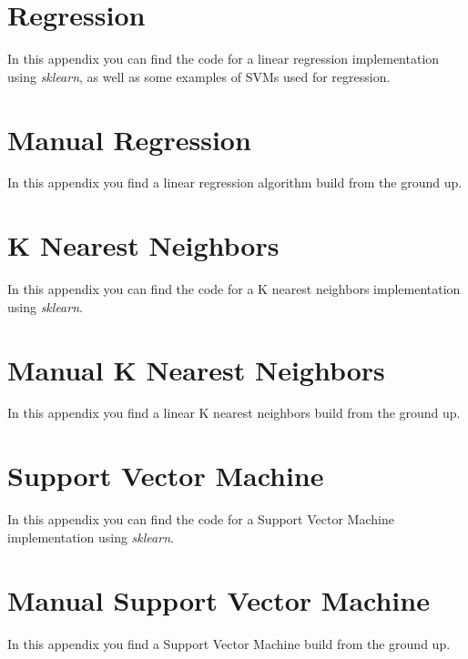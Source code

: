 \chapter{Regression}\label{code:regression}

In this appendix you can find the code for a linear regression implementation using \emph{sklearn}, as well as some examples of SVMs used for regression.


\chapter{Manual Regression}\label{code:manualregression}
In this appendix you find a linear regression algorithm build from the ground up.


\chapter{K Nearest Neighbors}\label{code:knn}
In this appendix you can find the code for a K nearest neighbors implementation using \emph{sklearn}.


\chapter{Manual K Nearest Neighbors}\label{code:mknn}
In this appendix you find a linear K nearest neighbors build from the ground up.


\chapter{Support Vector Machine}\label{code:svm}
In this appendix you can find the code for a Support Vector Machine implementation using \emph{sklearn}.


\chapter{Manual Support Vector Machine}\label{code:msvm}
In this appendix you find a Support Vector Machine build from the ground up.




